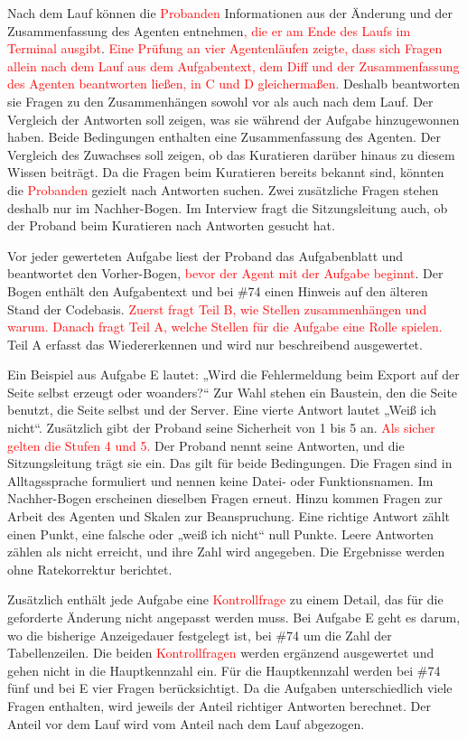 Nach dem Lauf können die \textcolor{red}{Probanden} Informationen aus der Änderung und der Zusammenfassung des Agenten entnehmen\textcolor{red}{, die er am Ende des Laufs im Terminal ausgibt}. \textcolor{red}{Eine Prüfung an vier Agentenläufen zeigte, dass sich Fragen allein nach dem Lauf aus dem Aufgabentext, dem Diff und der Zusammenfassung des Agenten beantworten ließen, in C und D gleichermaßen.} Deshalb beantworten sie Fragen zu den Zusammenhängen sowohl vor als auch nach dem Lauf. Der Vergleich der Antworten soll zeigen, was sie während der Aufgabe hinzugewonnen haben. Beide Bedingungen enthalten eine Zusammenfassung des Agenten. Der Vergleich des Zuwachses soll zeigen, ob das Kuratieren darüber hinaus zu diesem Wissen beiträgt. Da die Fragen beim Kuratieren bereits bekannt sind, könnten die \textcolor{red}{Probanden} gezielt nach Antworten suchen. Zwei zusätzliche Fragen stehen deshalb nur im Nachher-Bogen. Im Interview fragt die Sitzungsleitung auch, ob der Proband beim Kuratieren nach Antworten gesucht hat.

Vor jeder gewerteten Aufgabe liest der Proband das Aufgabenblatt und beantwortet den Vorher-Bogen, \textcolor{red}{bevor der Agent mit der Aufgabe beginnt}. Der Bogen enthält den Aufgabentext und bei \#74 einen Hinweis auf den älteren Stand der Codebasis. \textcolor{red}{Zuerst fragt Teil B, wie Stellen zusammenhängen und warum. Danach fragt Teil A, welche Stellen für die Aufgabe eine Rolle spielen.} Teil A erfasst das Wiedererkennen und wird nur beschreibend ausgewertet.

Ein Beispiel aus Aufgabe E lautet: „Wird die Fehlermeldung beim Export auf der Seite selbst erzeugt oder woanders?“ Zur Wahl stehen ein Baustein, den die Seite benutzt, die Seite selbst und der Server. Eine vierte Antwort lautet „Weiß ich nicht“. Zusätzlich gibt der Proband seine Sicherheit von 1 bis 5 an. \textcolor{red}{Als sicher gelten die Stufen 4 und 5.} Der Proband nennt seine Antworten, und die Sitzungsleitung trägt sie ein. Das gilt für beide Bedingungen. Die Fragen sind in Alltagssprache formuliert und nennen keine Datei- oder Funktionsnamen. Im Nachher-Bogen erscheinen dieselben Fragen erneut. Hinzu kommen Fragen zur Arbeit des Agenten und Skalen zur Beanspruchung. Eine richtige Antwort zählt einen Punkt, eine falsche oder „weiß ich nicht“ null Punkte. Leere Antworten zählen als nicht erreicht, und ihre Zahl wird angegeben. Die Ergebnisse werden ohne Ratekorrektur berichtet.

Zusätzlich enthält jede Aufgabe eine \textcolor{red}{Kontrollfrage} zu einem Detail, das für die geforderte Änderung nicht angepasst werden muss. Bei Aufgabe E geht es darum, wo die bisherige Anzeigedauer festgelegt ist, bei \#74 um die Zahl der Tabellenzeilen. Die beiden \textcolor{red}{Kontrollfragen} werden ergänzend ausgewertet und gehen nicht in die Hauptkennzahl ein. Für die Hauptkennzahl werden bei \#74 fünf und bei E vier Fragen berücksichtigt. Da die Aufgaben unterschiedlich viele Fragen enthalten, wird jeweils der Anteil richtiger Antworten berechnet. Der Anteil vor dem Lauf wird vom Anteil nach dem Lauf abgezogen.

